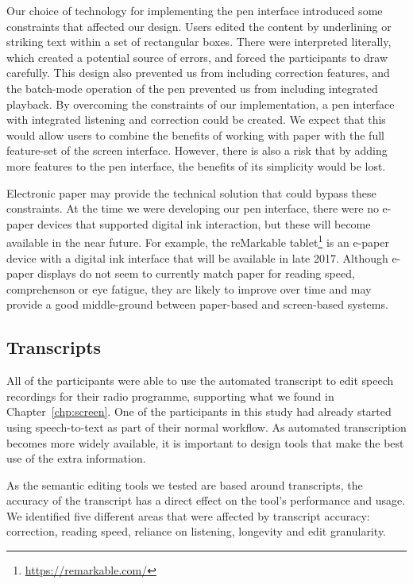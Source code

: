 Our choice of technology for implementing the pen interface introduced some constraints that affected our design.
Users edited the content by underlining or striking text within a set of rectangular boxes. There were interpreted
literally, which created a potential source of errors, and forced the participants to draw carefully. This design also
prevented us from including correction features, and the batch-mode operation of the pen prevented us from including
integrated playback.  By overcoming the constraints of our implementation, a pen interface with integrated listening
and correction could be created. We expect that this would allow users to combine the benefits of working with paper
with the full feature-set of the screen interface. However, there is also a risk that by adding more features to the
pen interface, the benefits of its simplicity would be lost.


Electronic paper may provide the technical solution that could bypass these constraints. At the time we were developing
our pen interface, there were no e-paper devices that supported digital ink interaction, but these will become
available in the near future.  For example, the reMarkable tablet\footnote{\url{https://remarkable.com/}} is an e-paper
device with a digital ink interface that will be available in late 2017. Although e-paper displays do not seem to
currently match paper for reading speed, comprehenson or eye fatigue, they are likely to improve over time and may
provide a good middle-ground between paper-based and screen-based systems. 

\subsection{Transcripts}

All of the participants were able to use the automated transcript to edit speech recordings for their radio programme,
supporting what we found in Chapter~\ref{chp:screen}. One of the participants in this study had already started using
speech-to-text as part of their normal workflow. As automated transcription becomes more widely available, it is
important to design tools that make the best use of the extra information.

As the semantic editing tools we tested are based around transcripts, the accuracy of the transcript has a direct
effect on the tool's performance and usage. We identified five different areas that were affected by transcript
accuracy: correction, reading speed, reliance on listening, longevity and edit granularity.

